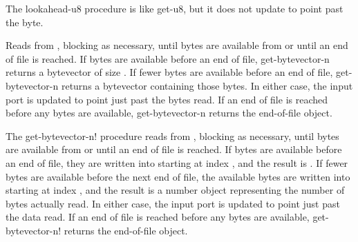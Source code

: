 \begin{entry}{%
}
   
The {\cf lookahead-u8} procedure is like {\cf get-u8}, but it does not 
update  to point past the byte.
\end{entry}

\begin{entry}{%
}
   

Reads from , blocking as necessary, until 
bytes are available from  or until an end of file is
reached. If  bytes are available before an end
of file, {\cf get-bytevector-n} returns a bytevector of size .
If fewer bytes are available before an end of file, {\cf get-bytevector-n}
returns a bytevector
containing those bytes. In either case, the input port is updated to
point just past the bytes read.  If an end of file is reached before
any bytes are available, {\cf get-bytevector-n} returns the end-of-file object.
\end{entry}

\begin{entry}{%
}

   
The {\cf get-bytevector-n!} procedure reads from ,
blocking as necessary, until
 bytes are available from  or until
an end of file is
reached. If  bytes are available before an end of file,
they are written into  starting at index , and
the result is . If fewer bytes are available before
the next end of file, the available bytes are written into 
starting at index , and the result is a number object
representing the number of bytes actually
read. In either case, the input port is updated to point just past the
data read. If an end of file is reached before any bytes
are available, {\cf get-bytevector-n!} returns the end-of-file object.
\end{entry}

